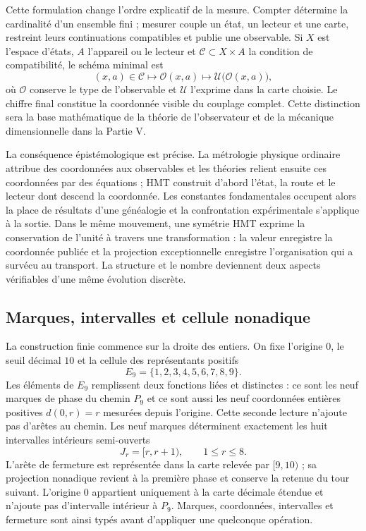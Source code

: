 Cette formulation change l'ordre explicatif de la mesure. Compter détermine
la cardinalité d'un ensemble fini ; mesurer couple un état, un lecteur et
une carte, restreint leurs continuations compatibles et publie une observable.
Si \(X\) est l'espace d'états, \(A\) l'appareil ou le lecteur et
\(\mathcal C\subset X\times A\) la condition de compatibilité, le schéma
minimal est
\[
 (x,a)\in\mathcal C
 \longmapsto \mathcal O(x,a)
 \longmapsto \mathcal U\bigl(\mathcal O(x,a)\bigr),
\]
où \(\mathcal O\) conserve le type de l'observable et \(\mathcal U\)
l'exprime dans la carte choisie. Le chiffre final constitue la coordonnée visible
du couplage complet. Cette distinction sera la base mathématique de la
théorie de l'observateur et de la mécanique dimensionnelle dans la Partie V.

La conséquence épistémologique est précise. La métrologie physique ordinaire
attribue des coordonnées aux observables et les théories relient ensuite ces
coordonnées par des équations ; HMT construit d'abord l'état, la route et le
lecteur dont descend la coordonnée. Les constantes fondamentales occupent
alors la place de résultats d'une généalogie et la confrontation expérimentale
s'applique à la sortie. Dans le même mouvement, une symétrie HMT exprime la
conservation de l'unité à travers une transformation : la valeur enregistre la
coordonnée publiée et la projection exceptionnelle enregistre l'organisation qui
a survécu au transport. La structure et le nombre deviennent deux
aspects vérifiables d'une même évolution discrète.

\subsection{Marques, intervalles et cellule nonadique}

La construction finie commence sur la droite des entiers. On fixe
l'origine \(0\), le seuil décimal \(10\) et la cellule des représentants
positifs
\[
 E_9=\{1,2,3,4,5,6,7,8,9\}.
\]
Les éléments de \(E_9\) remplissent deux fonctions liées et distinctes :
ce sont les neuf marques de phase du chemin \(P_9\) et ce sont aussi les neuf
coordonnées entières positives \(d(0,r)=r\) mesurées depuis l'origine. Cette
seconde lecture n'ajoute pas d'arêtes au chemin. Les neuf marques déterminent
exactement les huit intervalles intérieurs semi-ouverts
\[
 J_r=[r,r+1),\qquad 1\le r\le8.
\]
L'arête de fermeture est représentée dans la carte relevée par \([9,10)\) ; sa
projection nonadique revient à la première phase et conserve la retenue du
tour suivant. L'origine \(0\) appartient uniquement à la carte décimale étendue
et n'ajoute pas d'intervalle intérieur à \(P_9\). Marques, coordonnées, intervalles et
fermeture sont ainsi typés avant d'appliquer une quelconque opération.

